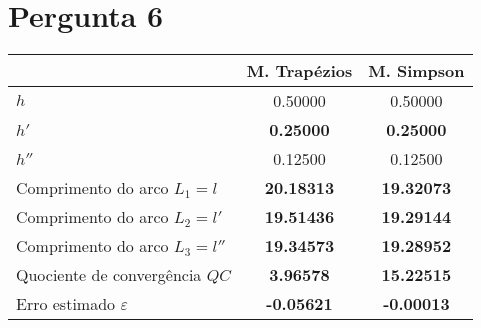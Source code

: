 {\section{Pergunta 6}


\begin{center}
    \begin{tabular}{l | c | c}
                                       & M. Trapézios & M. Simpson \\ \hline
        $h  $                          & 0.50000     &    0.50000 \\
        $h' $                          & \textbf{0.25000}     &    \textbf{0.25000} \\
        $h''$                          & 0.12500     &    0.12500 \\
        Comprimento do arco $L_1=l$    & \textbf{20.18313}    &    \textbf{19.32073} \\
        Comprimento do arco $L_2=l'$   & \textbf{19.51436}    &    \textbf{19.29144} \\
        Comprimento do arco $L_3=l''$  & \textbf{19.34573}    &    \textbf{19.28952} \\
        Quociente de convergência $QC$ & \textbf{3.96578}     &    \textbf{15.22515} \\
        Erro estimado $\varepsilon$    & \textbf{-0.05621}    &    \textbf{-0.00013}
    \end{tabular}
\end{center}
}